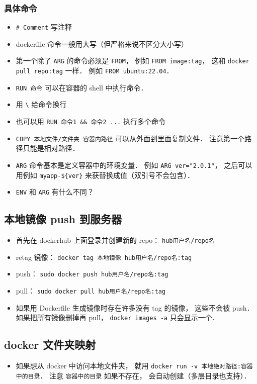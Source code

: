 \subsubsection{具体命令}
\begin{itemize}
\item \verb|# Comment| 写注释
\item dockerfile 命令一般用大写（但严格来说不区分大小写）
\item 第一个除了 \verb|ARG| 的命令必须是 \verb|FROM|， 例如 \verb|FROM image:tag|， 这和 \verb|docker pull repo:tag| 一样． 例如 \verb|FROM ubuntu:22.04|．
\item \verb|RUN 命令| 可以在容器的 shell 中执行命令．
\item 用 \verb|\| 给命令换行
\item 也可以用 \verb|RUN 命令1 && 命令2 ...| 执行多个命令
\item \verb|COPY 本地文件/文件夹 容器内路径| 可以从外面到里面复制文件． 注意第一个路径只能是相对路径．
\item \verb|ARG| 命令基本是定义容器中的环境变量． 例如 \verb|ARG ver="2.0.1"|， 之后可以用例如 \verb|myapp-${ver}| 来获替换成值（双引号不会包含）．
\item \verb|ENV| 和 \verb|ARG| 有什么不同？
\end{itemize}

\subsection{本地镜像 push 到服务器}
\begin{itemize}
\item 首先在 dockerhub 上面登录并创建新的 repo： \verb|hub用户名/repo名|
\item retag 镜像： \verb|docker tag 本地镜像 hub用户名/repo名:tag|
\item push： \verb|sudo docker push hub用户名/repo名:tag|
\item pull： \verb|sudo docker pull hub用户名/repo名:tag|
\item 如果用 Dockerfile 生成镜像时存在许多没有 tag 的镜像， 这些不会被 push． 如果把所有镜像删掉再 pull， \verb|docker images -a| 只会显示一个．
\end{itemize}

\subsection{docker 文件夹映射}
\begin{itemize}
\item 如果想从 docker 中访问本地文件夹， 就用 \verb|docker run -v 本地绝对路径:容器中的目录|． 注意 \verb|容器中的目录| 如果不存在， 会自动创建（多层目录也支持）．
\end{itemize}

